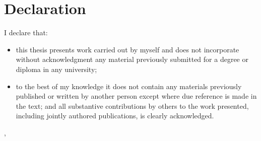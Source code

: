    \newpage
    \thispagestyle{plain}
    \chapter*{Declaration}
    I declare that:

    \begin{itemize}
        \item this thesis presents work carried out by myself and does not
            incorporate without acknowledgment any material previously
            submitted for a degree or diploma in any university;
        \item
            to the best of my knowledge it does not contain any materials
            previously published or written by another person except where due
            reference is made in the text; and all substantive contributions
            by others to the work presented, including jointly authored
            publications, is clearly acknowledged.
    \end{itemize}
    

    \vspace{2.5cm}
    \theauthor

    \city, \month~\year


\clearpage

